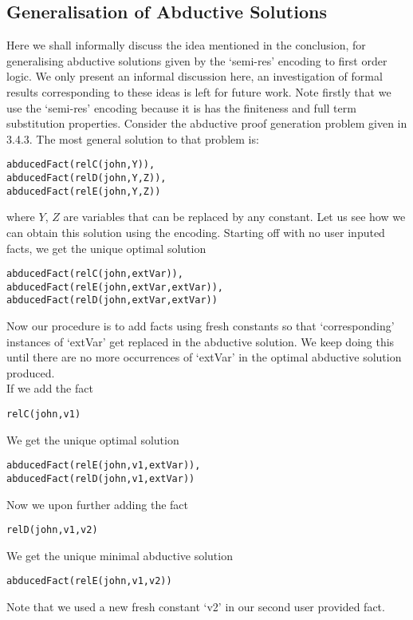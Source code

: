 \subsection{Generalisation of Abductive Solutions}\label{sec:generalisation_sol}

Here we shall informally discuss the idea mentioned in the conclusion, for
generalising abductive solutions given by the ‘semi-res’ encoding to first
order logic. We only present an informal discussion here, an investigation of
formal results corresponding to these ideas is left for future work. Note
firstly that we use the ‘semi-res’ encoding because it is has the finiteness
and full term substitution properties. Consider the abductive proof generation
problem given in 3.4.3. The most general solution to that problem is:

\begin{lstlisting}[frame = none] 
abducedFact(relC(john,Y)), 
abducedFact(relD(john,Y,Z)), 
abducedFact(relE(john,Y,Z))
\end{lstlisting}
where $Y$, $Z$ are variables that can be replaced by any constant. Let us see how we can obtain this solution using the encoding. Starting off with no user inputed facts, we get the unique optimal solution
\begin{lstlisting}[frame = none]
abducedFact(relC(john,extVar)), 
abducedFact(relE(john,extVar,extVar)),
abducedFact(relD(john,extVar,extVar))
\end{lstlisting}
Now our procedure is to add facts using fresh constants so that ‘corresponding’ instances of ‘extVar’ get replaced in the abductive solution. We keep doing this until there are no more occurrences of ‘extVar’ in the optimal abductive solution produced.\\ If we add the fact 
\begin{lstlisting}[frame = none]
relC(john,v1)
\end{lstlisting}
We get the unique optimal solution 
\begin{lstlisting}[frame = none]
abducedFact(relE(john,v1,extVar)),
abducedFact(relD(john,v1,extVar))
\end{lstlisting}
Now we upon further adding the fact 
\begin{lstlisting}[frame = none]
relD(john,v1,v2)
\end{lstlisting}
We get the unique minimal abductive solution 
\begin{lstlisting}[frame = none]
abducedFact(relE(john,v1,v2))
\end{lstlisting}
Note that we used a new fresh constant ‘v2’ in our second user provided fact.
